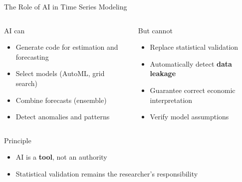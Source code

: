 \documentclass[9pt, aspectratio=169, t]{beamer}
\begin{document}
\begin{frame}{The Role of AI in Time Series Modeling}
    \begin{columns}[T]
        \begin{exampleblock}{AI can}
            \begin{itemize}\setlength{\itemsep}{0pt}
                \item Generate code for estimation and forecasting
                \item Select models (AutoML, grid search)
                \item Combine forecasts (ensemble)
                \item Detect anomalies and patterns
            \end{itemize}
        \end{exampleblock}

        \begin{alertblock}{But cannot}
            \begin{itemize}\setlength{\itemsep}{0pt}
                \item Replace statistical validation
                \item Automatically detect \textbf{data leakage}
                \item Guarantee correct economic interpretation
                \item Verify model assumptions
            \end{itemize}
        \end{alertblock}
    \end{columns}

    \vspace{0.3cm}

    \begin{block}{Principle}
        \begin{itemize}\setlength{\itemsep}{0pt}
            \item AI is a \textbf{tool}, not an authority
            \item Statistical validation remains the researcher's responsibility
        \end{itemize}
    \end{block}
\end{frame}
\end{document}
